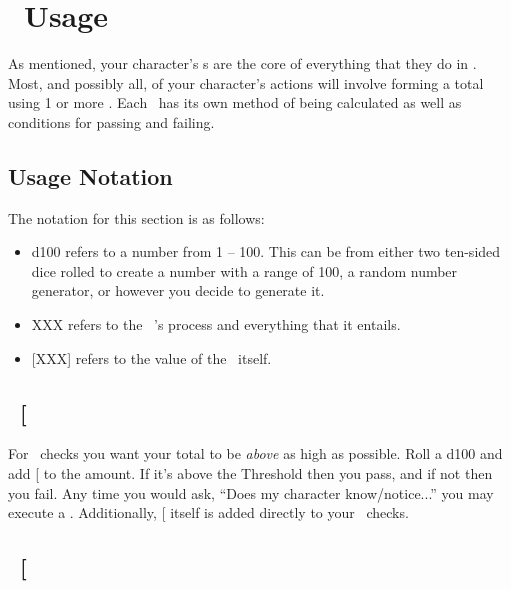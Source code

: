 \section{\attribute\ Usage}\label{sec:attr_usage}
As mentioned, your character's \attribute s are the core of everything that they do in \gametitle. Most, and possibly all, of your character's actions will involve forming a total using 1 or more \attribute . Each \attribute\ has its own method of being calculated as well as conditions for passing and failing. 

\subsection*{Usage Notation}\label{subsec:notation}
The notation for this section is as follows:
\begin{itemize}
	\item d100 refers to a number from 1 -- 100. This can be from either two ten-sided dice rolled to create a number with a range of 100, a random number generator, or however you decide to generate it.
	\item XXX refers to the \attribute\ 's process and everything that it entails.
	\item {[}XXX{]} refers to the value of the \attribute\ itself.
\end{itemize}
\clearpage

\subsection{\KNOWful\ {[}\KNOW\index{\attribute!\KNOWful}{]}}\label{subsec:kno}


\noindent For \KNOWful\ checks you want your total to be \textit{above} as high as possible.
\noindent Roll a d100 and add {[}\KNOW{]} to the amount. If it's above the Threshold then you pass, and if not then you fail.
\fillrlinemid
\noindent Any time you would ask, ``Does my character know/notice...'' you may execute a \KNOW. 
Additionally, {[}\KNOW{]} itself is added directly to your \skill\ checks.


\subsection{\POWEful\ {[}\POWE\index{\attribute!\POWEful}{]}}\label{subsec:pow}

